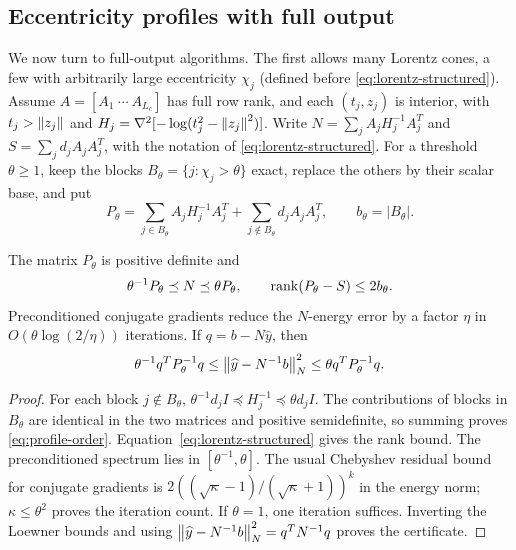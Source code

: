 \subsection{Eccentricity profiles with full output}\label{subsec:profile}
We now turn to full-output algorithms. The first allows many Lorentz
cones, a few with arbitrarily large eccentricity $\chi_j$ (defined before
\eqref{eq:lorentz-structured}). Assume
$A=[A_1\ \cdots\ A_{L_c}]$ has full row rank, and each
$(t_j,z_j)$ is interior, with $t_j>\left\lVert z_j\right\rVert$ and
$H_j=\nabla^2[-\log(t_j^2-\left\lVert z_j\right\rVert^2)]$. Write
$N=\sum_j A_jH_j^{-1}A_j^T$ and
$S=\sum_j d_jA_jA_j^T$, with the notation of
\eqref{eq:lorentz-structured}. For a threshold $\theta\geq1$, keep the
blocks $B_\theta=\{j:\chi_j>\theta\}$ exact, replace the others by their
scalar base, and put
\[
 P_\theta=\sum_{j\in B_\theta}A_jH_j^{-1}A_j^T
              +\sum_{j\notin B_\theta}d_jA_jA_j^T,
 \qquad b_\theta=|B_\theta|.
\]
\begin{proposition}
\label{prop:profile}
The matrix $P_\theta$ is positive definite and
\begin{equation}\label{eq:profile-order}
 \theta^{-1}P_\theta\preceq N\preceq\theta P_\theta,
 \qquad \operatorname{rank}(P_\theta-S)\leq2b_\theta.
\end{equation}
Preconditioned conjugate gradients reduce the $N$-energy error by a factor
$\eta$ in $O(\theta\log(2/\eta))$ iterations. If $q=b-N\widehat y$,
then
\begin{equation}\label{eq:profile-residual}
 \theta^{-1}q^TP_\theta^{-1}q
 \leq\left\lVert\widehat y-N^{-1}b\right\rVert_N^2
 \leq\theta q^TP_\theta^{-1}q.
\end{equation}
\end{proposition}
\begin{proof}
For each block $j\notin B_\theta$,
$\theta^{-1}d_jI\preceq H_j^{-1}\preceq\theta d_jI$.
The contributions of blocks in $B_\theta$ are identical in the two matrices and positive
semidefinite, so summing proves \eqref{eq:profile-order}.
Equation~\eqref{eq:lorentz-structured} gives the rank bound.
The preconditioned spectrum lies in $[\theta^{-1},\theta]$.
The usual Chebyshev residual bound for conjugate gradients is
$2((\sqrt\kappa-1)/(\sqrt\kappa+1))^k$ in the energy norm;
$\kappa\leq\theta^2$ proves the iteration count. If $\theta=1$,
one iteration suffices. Inverting the Loewner bounds and using
$\left\lVert\widehat y-N^{-1}b\right\rVert_N^2=q^TN^{-1}q$ proves the certificate.
\end{proof}

